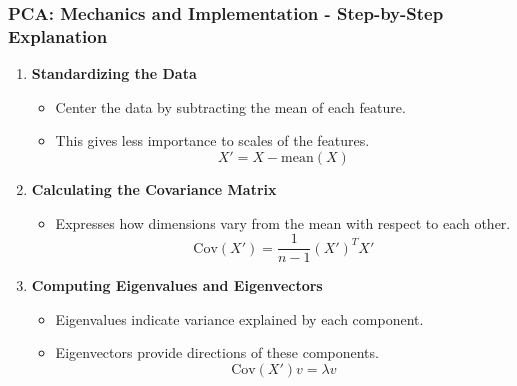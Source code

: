 \documentclass[aspectratio=169]{beamer}
\begin{document}
\begin{frame}[fragile]
    \frametitle{PCA: Mechanics and Implementation - Step-by-Step Explanation}
    \begin{enumerate}
        \item \textbf{Standardizing the Data}
            \begin{itemize}
                \item Center the data by subtracting the mean of each feature.
                \item This gives less importance to scales of the features.
                \begin{equation}
                    X' = X - \text{mean}(X)
                \end{equation}
            \end{itemize}

        \item \textbf{Calculating the Covariance Matrix}
            \begin{itemize}
                \item Expresses how dimensions vary from the mean with respect to each other.
                \begin{equation}
                    \text{Cov}(X') = \frac{1}{n-1} (X')^T X'
                \end{equation}
            \end{itemize}

        \item \textbf{Computing Eigenvalues and Eigenvectors}
            \begin{itemize}
                \item Eigenvalues indicate variance explained by each component.
                \item Eigenvectors provide directions of these components.
                \begin{equation}
                    \text{Cov}(X') v = \lambda v
                \end{equation}
            \end{itemize}
    \end{enumerate}
\end{frame}
\end{document}
